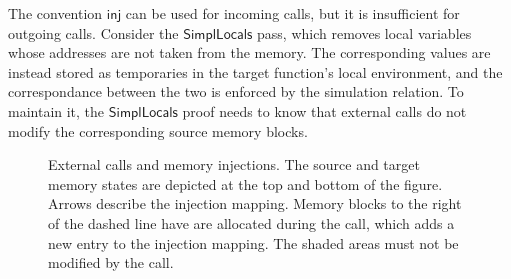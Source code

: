 \documentclass[sigplan,10pt,review,anonymous]{acmart}
\newcommand{\kw}[1]{\ensuremath{ \mathsf{#1} }}
\begin{document}
The convention \kw{inj} can be used for incoming calls,
but it is insufficient for outgoing calls.
Consider the \kw{SimplLocals} pass,
which removes local variables whose addresses are not taken
from the memory.
The corresponding values are instead stored
as temporaries in the target function's local environment,
and the correspondance between the two
is enforced by the simulation relation.
To maintain it,
the \kw{SimplLocals} proof needs to know that
external calls do not modify
the corresponding source memory blocks.

\begin{figure} %
  \caption{External calls and memory injections.
    The source and target memory states are
    depicted at the top and bottom
    of the figure. Arrows describe the injection mapping.
    Memory blocks to the right of the dashed line
    have are allocated during the call,
    which adds a new entry to the injection mapping.
    The shaded areas must not be modified by the call.
  }
  \label{fig:injp}
\end{figure}
\end{document}

